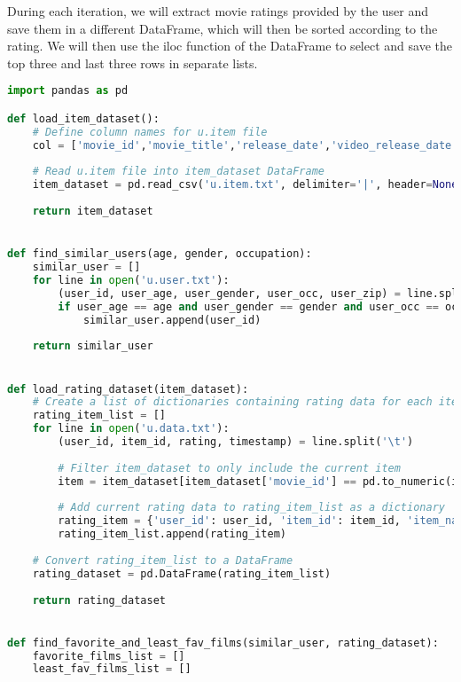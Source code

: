 \documentclass[12pt]{article}
\begin{document}
During each iteration, we will extract movie ratings provided by the user and save them in a different DataFrame, which will then be sorted according to the rating. We will then use the iloc function of the DataFrame to select and save the top three and last three rows in separate lists. 
\\
\begin{lstlisting}[language=Python, caption=Finding users with my preferences.] 
import pandas as pd

def load_item_dataset():
    # Define column names for u.item file
    col = ['movie_id','movie_title','release_date','video_release_date','IMDb_URL','unknown','Action','Adventure','Animation','Childrens','Comedy','Crime','Documentary','Drama','Fantasy','Film_Noir','Horror','Musical','Mystery','Romance','Sci_Fi','Thriller','War','Western']
    
    # Read u.item file into item_dataset DataFrame
    item_dataset = pd.read_csv('u.item.txt', delimiter='|', header=None, names=col)
    
    return item_dataset


def find_similar_users(age, gender, occupation):
    similar_user = []
    for line in open('u.user.txt'):
        (user_id, user_age, user_gender, user_occ, user_zip) = line.split('|')
        if user_age == age and user_gender == gender and user_occ == occupation:
            similar_user.append(user_id)
    
    return similar_user


def load_rating_dataset(item_dataset):
    # Create a list of dictionaries containing rating data for each item
    rating_item_list = []
    for line in open('u.data.txt'):
        (user_id, item_id, rating, timestamp) = line.split('\t')
        
        # Filter item_dataset to only include the current item
        item = item_dataset[item_dataset['movie_id'] == pd.to_numeric(item_id)]
        
        # Add current rating data to rating_item_list as a dictionary
        rating_item = {'user_id': user_id, 'item_id': item_id, 'item_name': item.iloc[0,1], 'rating': rating, 'timestamp': timestamp}
        rating_item_list.append(rating_item)
    
    # Convert rating_item_list to a DataFrame
    rating_dataset = pd.DataFrame(rating_item_list)
    
    return rating_dataset


def find_favorite_and_least_fav_films(similar_user, rating_dataset):
    favorite_films_list = []
    least_fav_films_list = []
    

\end{lstlisting}
\end{document}
